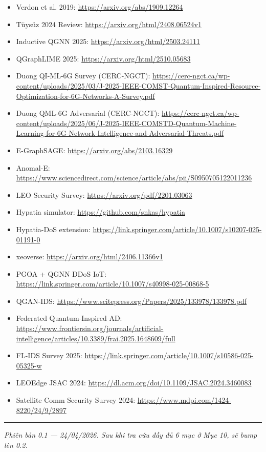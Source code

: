 \documentclass[11pt,a4paper]{article}
\begin{document}
\begin{itemize}\small
  \item Verdon et al. 2019: \url{https://arxiv.org/abs/1909.12264}
  \item Tüysüz 2024 Review: \url{https://arxiv.org/html/2408.06524v1}
  \item Inductive QGNN 2025: \url{https://arxiv.org/html/2503.24111}
  \item QGraphLIME 2025: \url{https://arxiv.org/html/2510.05683}
  \item Duong QI-ML-6G Survey (CERC-NGCT): \url{https://cerc-ngct.ca/wp-content/uploads/2025/03/J-2025-IEEE-COMST-Quantum-Inspired-Resource-Optimization-for-6G-Networks-A-Survey.pdf}
  \item Duong QML-6G Adversarial (CERC-NGCT): \url{https://cerc-ngct.ca/wp-content/uploads/2025/06/J-2025-IEEE-COMSTD-Quantum-Machine-Learning-for-6G-Network-Intelligence-and-Adversarial-Threats.pdf}
  \item E-GraphSAGE: \url{https://arxiv.org/abs/2103.16329}
  \item Anomal-E: \url{https://www.sciencedirect.com/science/article/abs/pii/S0950705122011236}
  \item LEO Security Survey: \url{https://arxiv.org/pdf/2201.03063}
  \item Hypatia simulator: \url{https://github.com/snkas/hypatia}
  \item Hypatia-DoS extension: \url{https://link.springer.com/article/10.1007/s10207-025-01191-0}
  \item xeoverse: \url{https://arxiv.org/html/2406.11366v1}
  \item PGOA + QGNN DDoS IoT: \url{https://link.springer.com/article/10.1007/s40998-025-00868-5}
  \item QGAN-IDS: \url{https://www.scitepress.org/Papers/2025/133978/133978.pdf}
  \item Federated Quantum-Inspired AD: \url{https://www.frontiersin.org/journals/artificial-intelligence/articles/10.3389/frai.2025.1648609/full}
  \item FL-IDS Survey 2025: \url{https://link.springer.com/article/10.1007/s10586-025-05325-w}
  \item LEOEdge JSAC 2024: \url{https://dl.acm.org/doi/10.1109/JSAC.2024.3460083}
  \item Satellite Comm Security Survey 2024: \url{https://www.mdpi.com/1424-8220/24/9/2897}
\end{itemize}

\vspace{0.4cm}
\hrule
\vspace{0.3cm}
\textit{\small Phiên bản 0.1 --- 24/04/2026. Sau khi tra cứu đầy đủ 6 mục ở Mục 10, sẽ bump lên 0.2.}
\end{document}

